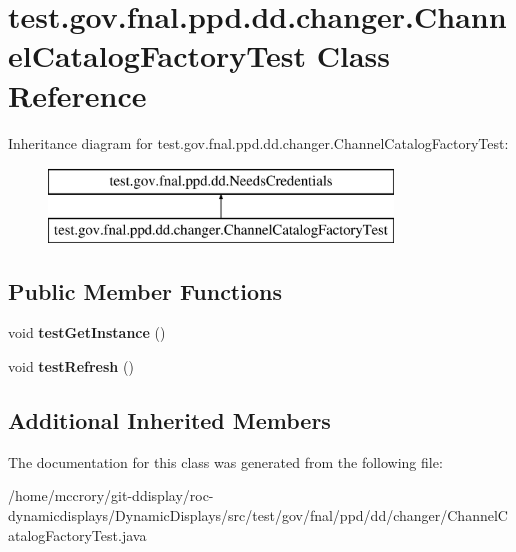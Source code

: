 \hypertarget{classtest_1_1gov_1_1fnal_1_1ppd_1_1dd_1_1changer_1_1ChannelCatalogFactoryTest}{\section{test.\-gov.\-fnal.\-ppd.\-dd.\-changer.\-Channel\-Catalog\-Factory\-Test Class Reference}
\label{classtest_1_1gov_1_1fnal_1_1ppd_1_1dd_1_1changer_1_1ChannelCatalogFactoryTest}
}
Inheritance diagram for test.\-gov.\-fnal.\-ppd.\-dd.\-changer.\-Channel\-Catalog\-Factory\-Test\-:\begin{figure}[H]
\begin{center}
\leavevmode
\includegraphics[height=2.000000cm]{classtest_1_1gov_1_1fnal_1_1ppd_1_1dd_1_1changer_1_1ChannelCatalogFactoryTest}
\end{center}
\end{figure}
\subsection*{Public Member Functions}
\begin{DoxyCompactItemize}
\item 
\hypertarget{classtest_1_1gov_1_1fnal_1_1ppd_1_1dd_1_1changer_1_1ChannelCatalogFactoryTest_a0f381506eaec142e6ffdd0c4ea09bcba}{void {\bfseries test\-Get\-Instance} ()}\label{classtest_1_1gov_1_1fnal_1_1ppd_1_1dd_1_1changer_1_1ChannelCatalogFactoryTest_a0f381506eaec142e6ffdd0c4ea09bcba}

\item 
\hypertarget{classtest_1_1gov_1_1fnal_1_1ppd_1_1dd_1_1changer_1_1ChannelCatalogFactoryTest_a4874cd96233775a71b46d9ff235ffb7e}{void {\bfseries test\-Refresh} ()}\label{classtest_1_1gov_1_1fnal_1_1ppd_1_1dd_1_1changer_1_1ChannelCatalogFactoryTest_a4874cd96233775a71b46d9ff235ffb7e}

\end{DoxyCompactItemize}
\subsection*{Additional Inherited Members}


The documentation for this class was generated from the following file\-:\begin{DoxyCompactItemize}
\item 
/home/mccrory/git-\/ddisplay/roc-\/dynamicdisplays/\-Dynamic\-Displays/src/test/gov/fnal/ppd/dd/changer/Channel\-Catalog\-Factory\-Test.\-java\end{DoxyCompactItemize}
